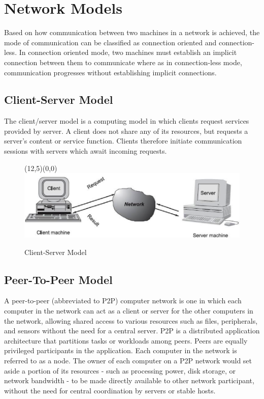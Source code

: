 \section{Network Models}
Based on how communication between two machines in a network is achieved, the mode of communication can be classified as connection oriented and connection-less. In connection oriented mode, two machines must establish an implicit connection between them to communicate where as in connection-less mode, communication progresses without establishing implicit connections.

\subsection{Client-Server Model}
The client/server model is a computing model in which clients request services provided by server. A client does not share any of its resources, but requests a server's content or service function. Clients therefore initiate communication sessions with servers which await incoming requests.
\begin{figure}[htbp]
			\begin{center}
			\setlength{\unitlength}{1cm}
			\begin{picture}(12,5)(0,0)
			\includegraphics[width=12cm]{./Networking/networking/clientServer.png}
			\end{picture}
	\caption{Client-Server Model}
	\label{ClientServer}
	\end{center}
	\end{figure}
\subsection{Peer-To-Peer Model}
A peer-to-peer (abbreviated to P2P) computer network is one in which each computer in the network can act as a client or server for the other computers in the network, allowing shared access to various resources such as files, peripherals, and sensors without the need for a central server.
P2P is a distributed application architecture that partitions tasks or workloads among peers. Peers are equally privileged participants in the application. Each computer in the network is referred to as a node. The owner of each computer on a P2P network would set aside a portion of its resources - such as processing power, disk storage, or network bandwidth - to be made directly available to other network participant, without the need for central coordination by servers or stable hosts.